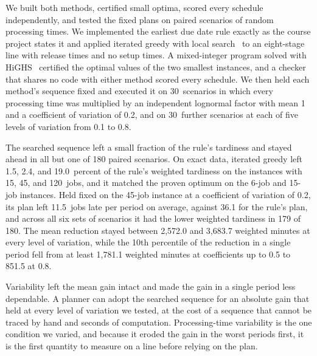 \sumpara We built both methods, certified small optima, scored every schedule independently, and tested the fixed plans on paired scenarios of random processing times. \sumparaend
\fin We implemented the earliest due date rule exactly as the course project states it and applied iterated greedy with local search~\cite{ruiz2008igwt} to an eight-stage line with release times and no setup times. \fine
\fin A mixed-integer program solved with HiGHS~\cite{highs} certified the optimal values of the two smallest instances, and a checker that shares no code with either method scored every schedule. \fine
\fin We then held each method's sequence fixed and executed it on 30~scenarios in which every processing time was multiplied by an independent lognormal factor with mean 1 and a coefficient of variation of 0.2, and on 30~further scenarios at each of five levels of variation from 0.1 to 0.8. \fine

\sumpara The searched sequence left a small fraction of the rule's tardiness and stayed ahead in all but one of 180 paired scenarios. \sumparaend
\fin On exact data, iterated greedy left 1.5, 2.4, and 19.0~percent of the rule's weighted tardiness on the instances with 15, 45, and 120~jobs, and it matched the proven optimum on the 6-job and 15-job instances. \fine
\fin Held fixed on the 45-job instance at a coefficient of variation of 0.2, its plan left 11.5~jobs late per period on average, against 36.1 for the rule's plan, and across all six sets of scenarios it had the lower weighted tardiness in 179 of 180. \fine
\fin The mean reduction stayed between 2,572.0 and 3,683.7 weighted minutes at every level of variation, while the 10th percentile of the reduction in a single period fell from at least 1,781.1 weighted minutes at coefficients up to 0.5 to 851.5 at 0.8. \fine

\sumpara Variability left the mean gain intact and made the gain in a single period less dependable. \sumparaend
\fin A planner can adopt the searched sequence for an absolute gain that held at every level of variation we tested, at the cost of a sequence that cannot be traced by hand and seconds of computation. \fine
\fin Processing-time variability is the one condition we varied, and because it eroded the gain in the worst periods first, it is the first quantity to measure on a line before relying on the plan. \fine
